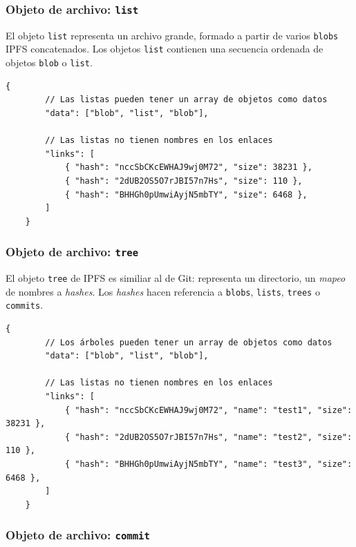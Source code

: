 \documentclass[12pt]{article} %
\begin{document}

\subsubsection{Objeto de archivo: \texttt{list}} %
\label{ssub:objeto_de_archivo_list}

El objeto \texttt{list} representa un archivo grande, formado a partir de varios \texttt{blobs} IPFS concatenados. Los objetos \texttt{list} contienen una secuencia ordenada de objetos \texttt{blob} o \texttt{list}.

\begin{lstlisting}[caption={Estructura JSON de un \texttt{list}.}]
	{
		// Las listas pueden tener un array de objetos como datos
		"data": ["blob", "list", "blob"],

		// Las listas no tienen nombres en los enlaces
		"links": [
			{ "hash": "nccSbCKcEWHAJ9wj0M72", "size": 38231 },
			{ "hash": "2dUB2OS5O7rJBI57n7Hs", "size": 110 },
			{ "hash": "BHHGh0pUmwiAyjN5mbTY", "size": 6468 },
		]
	}
\end{lstlisting}


\subsubsection{Objeto de archivo: \texttt{tree}} %
\label{ssub:objeto_de_archivo_tree}

El objeto \texttt{tree} de IPFS es similiar al de Git: representa un directorio, un \textit{mapeo} de nombres a \textit{hashes}. Los \textit{hashes} hacen referencia a \texttt{blobs}, \texttt{lists}, \texttt{trees} o \texttt{commits}.

\begin{lstlisting}[caption={Estructura JSON de un \texttt{tree}.}]
	{
		// Los árboles pueden tener un array de objetos como datos
		"data": ["blob", "list", "blob"],

		// Las listas no tienen nombres en los enlaces
		"links": [
			{ "hash": "nccSbCKcEWHAJ9wj0M72", "name": "test1", "size": 38231 },
			{ "hash": "2dUB2OS5O7rJBI57n7Hs", "name": "test2", "size": 110 },
			{ "hash": "BHHGh0pUmwiAyjN5mbTY", "name": "test3", "size": 6468 },
		]
	}
\end{lstlisting}


\subsubsection{Objeto de archivo: \texttt{commit}} %
\label{ssub:objeto_de_archivo_commit}
\end{document}
